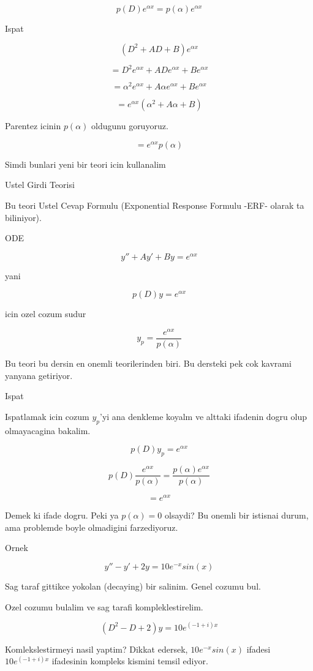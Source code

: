 \documentclass[12pt,fleqn]{article}
\begin{document}
\[ p(D)e^{\alpha x} = p(\alpha)e^{\alpha x}  \]

Ispat

\[ (D^2 + AD + B )e^{\alpha x} \]

\[ = D^2e^{\alpha x} + ADe^{\alpha x} + Be^{\alpha x} \]

\[ = \alpha^2 e^{\alpha x} + A \alpha e^{\alpha x} + Be^{\alpha x} \]

\[ = e^{\alpha x}(\alpha^2  + A \alpha + B)\]

Parentez icinin $p(\alpha)$ oldugunu goruyoruz. 

\[ = e^{\alpha x}p(\alpha)\]

Simdi bunlari yeni bir teori icin kullanalim

Ustel Girdi Teorisi 

Bu teori Ustel Cevap Formulu (Exponential Response Formulu -ERF- olarak ta
biliniyor).

ODE

\[ y'' + Ay' + By = e^{\alpha x} \]

yani

\[ p(D)y = e^{\alpha x} \]

icin ozel cozum sudur

\[ y_p = \frac{e^{\alpha x}}{p(\alpha)} \]

Bu teori bu dersin en onemli teorilerinden biri. Bu dersteki pek cok
kavrami yanyana getiriyor. 

Ispat

Ispatlamak icin cozum $y_p$'yi ana denkleme koyalm ve alttaki ifadenin dogru
olup olmayacagina bakalim.

\[ p(D)y_p =  e^{\alpha x} \]

\[ p(D)\frac{e^{\alpha x}}{p(\alpha)} = \frac{p(\alpha)e^{\alpha x}}{p(\alpha)} \]

\[ = e^{\alpha x} \]

Demek ki ifade dogru. Peki ya $p(\alpha) = 0$ olsaydi? Bu onemli bir
istisnai durum, ama problemde boyle olmadigini farzediyoruz.

Ornek 

\[ y'' - y' + 2y = 10e^{-x}sin(x) \]

Sag taraf gittikce yokolan (decaying) bir salinim. Genel cozumu bul.

Ozel cozumu bulalim ve sag tarafi kompleklestirelim. 

\[ (D^2 - D + 2)y = 10 e ^{(-1 + i)x} \]

Komlekslestirmeyi nasil yaptim? Dikkat edersek, $10e^{-x}sin(x)$ ifadesi
$10 e^{(-1 + i)x}$ ifadesinin kompleks kismini temsil ediyor. 
\end{document}
